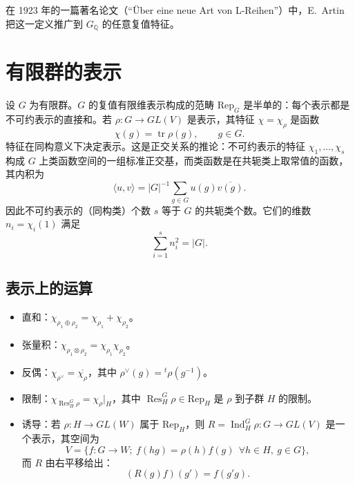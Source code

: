 在 1923 年的一篇著名论文（“\"Uber eine neue Art von L-Reihen”）中，E.~Artin 把这一定义推广到 $G_{\mathbb{Q}}$ 的任意复值特征。

\section{有限群的表示}\label{c4:sec:2}

设 $G$ 为有限群。$G$ 的复值有限维表示构成的范畴 $\mathrm{Rep}_G$ 是半单的：每个表示都是不可约表示的直接和。若 $\rho\colon G\to GL(V)$ 是表示，其特征 $\chi=\chi_\rho$ 是函数
\begin{equation}\tag{2.1}\label{c4:eq:2.1}
\chi(g)=\operatorname{tr}\rho(g),\qquad g\in G .
\end{equation}
特征在同构意义下决定表示。这是正交关系的推论：不可约表示的特征 $\chi_1,\dots,\chi_s$ 构成 $G$ 上类函数空间的一组标准正交基，而类函数是在共轭类上取常值的函数，其内积为
\begin{equation}\tag{2.2}\label{c4:eq:2.2}
\langle u,v\rangle=|G|^{-1}\sum_{g\in G}u(g)\overline{v(g)} .
\end{equation}
因此不可约表示的（同构类）个数 $s$ 等于 $G$ 的共轭类个数。它们的维数 $n_i=\chi_i(1)$ 满足
\begin{equation}\tag{2.3}\label{c4:eq:2.3}
\sum_{i=1}^{s}n_i^{2}=|G| .
\end{equation}

\subsection{表示上的运算}\label{c4:sec:2.1}

\begin{itemize}[leftmargin=2.2em,itemsep=0.25em]
\item 直和：$\chi_{\rho_1\oplus\rho_2}=\chi_{\rho_1}+\chi_{\rho_2}$。
\item 张量积：$\chi_{\rho_1\otimes\rho_2}=\chi_{\rho_1}\chi_{\rho_2}$。
\item 反偶：$\chi_{\rho^{\vee}}=\overline{\chi_\rho}$，其中 $\rho^{\vee}(g)={}^{t}\rho(g^{-1})$。
\item 限制：$\chi_{\operatorname{Res}^{G}_{H}\rho}=\chi_\rho|_{H}$，其中 $\operatorname{Res}^{G}_{H}\rho\in\mathrm{Rep}_H$ 是 $\rho$ 到子群 $H$ 的限制。
\item 诱导：若 $\rho\colon H\to GL(W)$ 属于 $\mathrm{Rep}_H$，则 $R=\operatorname{Ind}^{G}_{H}\rho\colon G\to GL(V)$ 是一个表示，其空间为
\begin{equation}\tag{2.4}\label{c4:eq:2.4}
V=\{f\colon G\to W;\ f(hg)=\rho(h)f(g)\ \ \forall h\in H,\ g\in G\},
\end{equation}
而 $R$ 由右平移给出：
\begin{equation}\tag{2.5}\label{c4:eq:2.5}
(R(g)f)(g')=f(g'g).
\end{equation}
\end{itemize}

